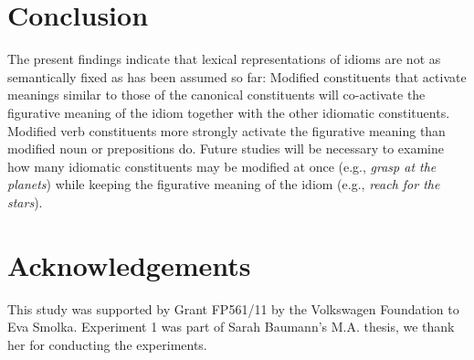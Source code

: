 \documentclass[output=paper]{langsci/langscibook}
\begin{document}
\section{Conclusion}
The present findings indicate that lexical representations of idioms are not as semantically fixed as has been assumed so far: Modified constituents that activate meanings similar to those of the canonical constituents will co-activate the figurative meaning of the idiom together with the other idiomatic constituents. Modified verb constituents more strongly activate the figurative meaning than modified noun or prepositions do. Future studies will be necessary to examine how many idiomatic constituents may be modified at once (e.g., \textit{grasp at the planets}) while keeping the figurative meaning of the idiom (e.g., \textit{reach for the stars}).

\section*{Acknowledgements}\largerpage[2]
This study was supported by Grant FP561/11 by the Volkswagen Foundation to Eva Smolka. Experiment 1 was part of Sarah Baumann's M.A. thesis, we thank her for conducting the experiments.


{\sloppy\printbibliography[heading=subbibliography]}
\end{document}
